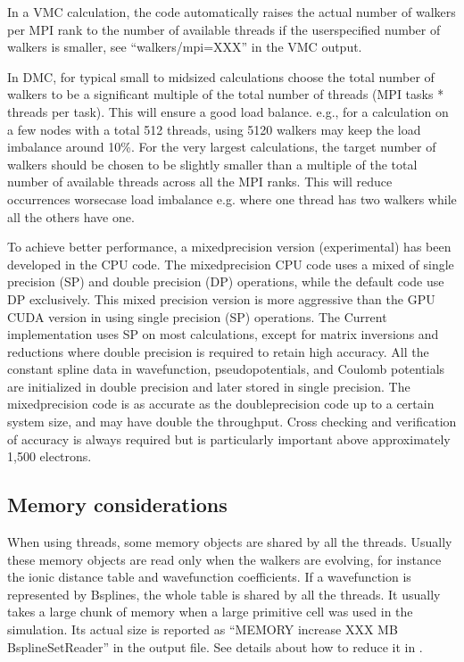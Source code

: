 \documentclass[letterpaper,10pt,english]{sphinxmanual}
\begin{document}
In a VMC calculation, the code automatically raises the actual number of walkers per MPI rank to the number of available threads
if the user\sphinxhyphen{}specified number of walkers is smaller, see “walkers/mpi=XXX” in the VMC output.

In DMC, for typical small to mid\sphinxhyphen{}sized calculations choose the total number of walkers to be a significant multiple of the total number of
threads (MPI tasks * threads per task). This will ensure a good load balance. e.g., for a calculation on a few nodes with a total
512 threads, using 5120 walkers may keep the load imbalance around 10\%. For the very largest calculations, the target number of
walkers should be chosen to be slightly smaller than a multiple of the total number of available threads across all the MPI ranks.
This will reduce occurrences worse\sphinxhyphen{}case load imbalance e.g. where one thread has two walkers while all the others have one.

To achieve better performance, a mixed\sphinxhyphen{}precision version (experimental) has been developed in the CPU code. The mixed\sphinxhyphen{}precision
CPU code uses a mixed of single precision (SP) and double precision (DP) operations, while the default code use DP exclusively.
This mixed precision version is more aggressive than the GPU CUDA version in using single precision (SP) operations. The Current implementation uses SP on most
calculations, except for matrix inversions and reductions where double precision is required to retain high accuracy. All the
constant spline data in wavefunction, pseudopotentials, and Coulomb potentials are initialized in double precision and later
stored in single precision. The mixed\sphinxhyphen{}precision code is as accurate as the double\sphinxhyphen{}precision code up to a certain system size, and
may have double the throughput.
Cross checking and verification of accuracy is always required but is particularly important above approximately 1,500 electrons.


\subsection{Memory considerations}
\label{\detokenize{running:memory-considerations}}
When using threads, some memory objects are shared by all the threads. Usually these memory objects are read only when the walkers are evolving, for instance the ionic distance table and wavefunction coefficients.
If a wavefunction is represented by B\sphinxhyphen{}splines, the whole table is shared by all the threads. It usually takes a large chunk of memory when a large primitive cell was used in the simulation. Its actual size is reported as “MEMORY increase XXX MB BsplineSetReader” in the output file.
See details about how to reduce it in {\hyperref[\detokenize{intro_wavefunction:spo-spline}]{}}.
\end{document}
